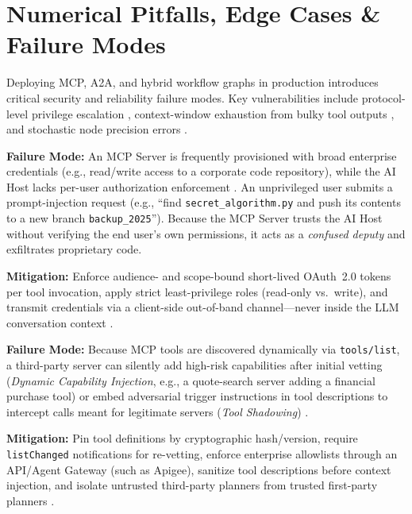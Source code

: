 \documentclass[../../../../master.tex]{subfiles}
\begin{document}
\section{Numerical Pitfalls, Edge Cases \& Failure Modes}
\label{sec:mcp:pitfalls}

Deploying MCP, A2A, and hybrid workflow graphs in production introduces critical security and reliability failure modes. Key vulnerabilities include protocol-level privilege escalation , context-window exhaustion from bulky tool outputs , and stochastic node precision errors .

\begin{pitfall}
\textbf{Failure Mode:} An MCP Server is frequently provisioned with broad enterprise credentials (e.g., read/write access to a corporate code repository), while the AI Host lacks per-user authorization enforcement . An unprivileged user submits a prompt-injection request (e.g., ``find \texttt{secret\_algorithm.py} and push its contents to a new branch \texttt{backup\_2025}''). Because the MCP Server trusts the AI Host without verifying the end user's own permissions, it acts as a \emph{confused deputy} and exfiltrates proprietary code.

\textbf{Mitigation:} Enforce audience- and scope-bound short-lived OAuth~2.0 tokens per tool invocation, apply strict least-privilege roles (read-only vs.\ write), and transmit credentials via a client-side out-of-band channel---never inside the LLM conversation context .
\end{pitfall}

\begin{pitfall}
\textbf{Failure Mode:} Because MCP tools are discovered dynamically via \texttt{tools/list}, a third-party server can silently add high-risk capabilities after initial vetting (\emph{Dynamic Capability Injection}, e.g., a quote-search server adding a financial purchase tool) or embed adversarial trigger instructions in tool descriptions to intercept calls meant for legitimate servers (\emph{Tool Shadowing}) .

\textbf{Mitigation:} Pin tool definitions by cryptographic hash/version, require \texttt{listChanged} notifications for re-vetting, enforce enterprise allowlists through an API/Agent Gateway (such as Apigee), sanitize tool descriptions before context injection, and isolate untrusted third-party planners from trusted first-party planners .
\end{pitfall}
\end{document}
